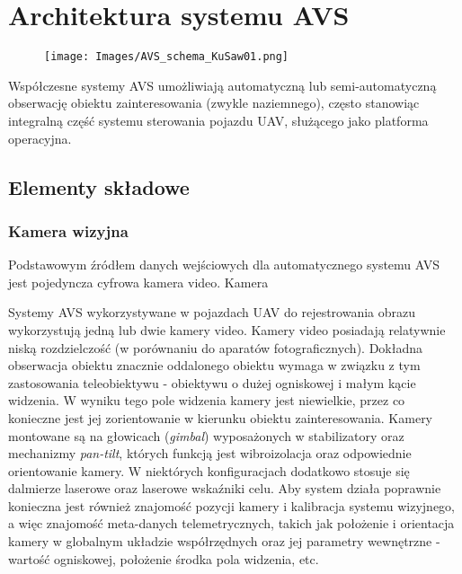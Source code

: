 \chapter{Architektura systemu AVS}
\label{cha:ArchitekturaSystemuAVS}

\begin{figure}[!htb]
	\centering
	\texttt{[image: Images/AVS\_schema\_KuSaw01.png]} 
	\label{img:AVS_schema}
\end{figure}

Współczesne systemy AVS umożliwiają automatyczną lub semi-automatyczną obserwację obiektu zainteresowania (zwykle naziemnego), często stanowiąc integralną część systemu sterowania pojazdu UAV, służącego jako platforma operacyjna. 

\section{Elementy składowe}
\label{sec:ElementySkladowe}
\subsection{Kamera wizyjna}
\label{subsec:KameraWizyjna}
Podstawowym źródłem danych wejściowych dla automatycznego systemu AVS jest pojedyncza cyfrowa kamera video. Kamera 


\label{subsec:SensorWizyjny}
Systemy AVS wykorzystywane w pojazdach UAV do rejestrowania obrazu wykorzystują jedną lub dwie kamery video. Kamery video posiadają relatywnie niską rozdzielczość (w porównaniu do aparatów fotograficznych). Dokładna obserwacja obiektu znacznie oddalonego obiektu wymaga w związku z tym zastosowania teleobiektywu - obiektywu o dużej ogniskowej i małym kącie widzenia. W wyniku tego pole widzenia kamery jest niewielkie, przez co konieczne jest jej zorientowanie w kierunku obiektu zainteresowania.  Kamery montowane są na głowicach (\textit{gimbal}) wyposażonych w  stabilizatory oraz mechanizmy \textit{pan-tilt}, których funkcją jest wibroizolacja oraz odpowiednie orientowanie kamery. W niektórych konfiguracjach dodatkowo stosuje się dalmierze laserowe oraz laserowe wskaźniki celu. Aby system działa poprawnie konieczna jest również znajomość pozycji kamery i kalibracja systemu wizyjnego, a więc znajomość meta-danych telemetrycznych, takich jak położenie i orientacja kamery w globalnym układzie współrzędnych oraz jej parametry wewnętrzne - wartość ogniskowej, położenie środka pola widzenia, etc.

